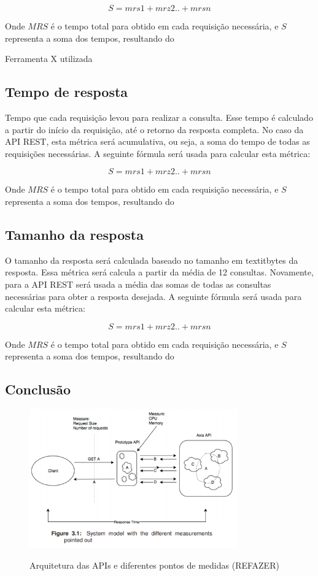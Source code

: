 $$S=mrs1+mrz2..+mrsn$$

Onde $MRS$ é o tempo total para obtido em cada requisição necessária, e $S$ representa a soma dos tempos, resultando do 

Ferramenta X utilizada

\subsection*{Tempo de resposta}

Tempo que cada requisição levou para realizar a consulta. Esse tempo é calculado a partir do início da requisição, até o retorno da resposta completa. No caso da API REST, esta métrica será acumulativa, ou seja, a soma do tempo de todas as requisições necessárias. A seguinte fórmula será usada para calcular esta métrica: 

$$S=mrs1+mrz2..+mrsn$$

Onde $MRS$ é o tempo total para obtido em cada requisição necessária, e $S$ representa a soma dos tempos, resultando do 

\subsection*{Tamanho da resposta}

O tamanho da resposta será calculada baseado no tamanho em textit{bytes} da resposta. Essa métrica será calcula a partir da média de 12 consultas. Novamente, para a API REST será usada a média das somas de todas as consultas necessárias para obter a resposta desejada. A seguinte fórmula será usada para calcular esta métrica: 

$$S=mrs1+mrz2..+mrsn$$

Onde $MRS$ é o tempo total para obtido em cada requisição necessária, e $S$ representa a soma dos tempos, resultando do 

\subsection*{Conclusão}

\begin{figure}[htbp]
\centering
\includegraphics[width=0.8\textwidth]{figuras/metricas.PNG}
\label{fig:my-metrics}
\caption{Arquitetura das APIs e diferentes pontos de medidas (REFAZER)}
\author{fonte: Autor}
\end{figure}

